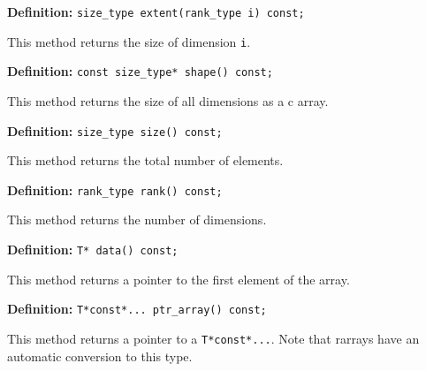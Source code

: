 \documentclass[11pt,twoside]{article}
\begin{document}
\noindent\textbf{Definition:} \texttt{size\_type extent(rank\_type i) const;}

This method returns the size of dimension \texttt{i}.

\noindent\textbf{Definition:} \texttt{const size\_type* shape() const;}

This method returns the size of all dimensions as a c array. 

\noindent\textbf{Definition:} \texttt{size\_type size() const;}

This method returns the total number of elements.

\noindent\textbf{Definition:} \texttt{rank\_type rank() const;}

This method returns the number of dimensions.


\noindent\textbf{Definition:} \texttt{T* data() const;}

This method returns a pointer to the first element of the array.


\noindent\textbf{Definition:} \texttt{T*const*... ptr\_array() const;}

This method returns a pointer to a \texttt{T*const*...}.  Note that
rarrays have an automatic conversion to this type.

\end{document}
